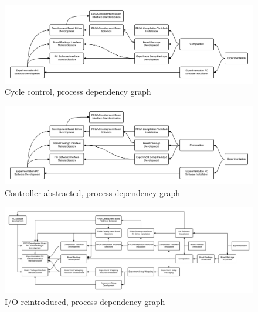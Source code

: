\documentclass[openright]{template/uva-bachelor-thesis}
\begin{document}
\begin{landscape}
\begin{figure}
\centering
\includegraphics[width=\hsize]{img/processes-dependencies-control}
\caption{Cycle control, process dependency graph}
\label{fig:dependencies-control}
\end{figure}
\end{landscape}

\begin{landscape}
\begin{figure}
\centering
\includegraphics[width=\hsize]{img/processes-dependencies-abstract}
\caption{Controller abstracted, process dependency graph}
\label{fig:dependencies-abstract}
\end{figure}
\end{landscape}

\begin{landscape}
\begin{figure}
\centering
\includegraphics[width=\hsize]{img/processes-dependencies-io}
\caption{I/O reintroduced, process dependency graph}
\label{fig:dependencies-io}
\end{figure}
\end{landscape}
\end{document}
